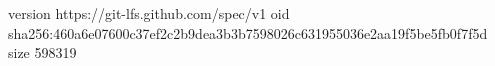 version https://git-lfs.github.com/spec/v1
oid sha256:460a6e07600c37ef2c2b9dea3b3b7598026c631955036e2aa19f5be5fb0f7f5d
size 598319
